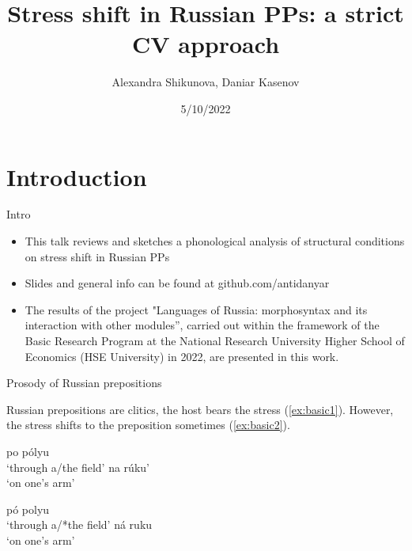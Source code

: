 \documentclass{beamer}
\title{Stress shift in Russian PPs: a strict CV approach}
\date{5/10/2022 \\ }
\author{Alexandra Shikunova, Daniar Kasenov}
\begin{document}
\maketitle

	\section{Introduction}

	\begin{frame}{Intro}
	
		\begin{itemize}
			\item This talk reviews and sketches a phonological analysis of structural conditions on stress shift in Russian PPs 

			\item Slides and general info can be found at github.com/antidanyar

			\item {\small The results of the project "Languages of Russia: morphosyntax and its interaction with other modules”, carried out within the framework of the Basic Research Program at the National Research University Higher School of Economics (HSE University) in 2022, are presented in this work.}

		\end{itemize}

	\end{frame}

	\begin{frame}{Prosody of Russian prepositions}

		Russian prepositions are clitics, the host bears the stress (\ref{ex:basic1}). However, the stress shifts to the preposition sometimes (\ref{ex:basic2}).
		
		\begin{minipage}{.48\textwidth}
		\pex\label{ex:basic1}
				\a po pólyu\\
				`through a/the field'
				\a na rúku’\\
				`on one's arm'
		\xe
		\end{minipage}
		\hfill
		\begin{minipage}{.49\textwidth}
		\pex\label{ex:basic2}
				\a pó polyu\\
				`through a/*the field'
				\a ná ruku\\
				`on one's arm'
		\xe
		\end{minipage}

	\end{frame}
	
\end{document}
